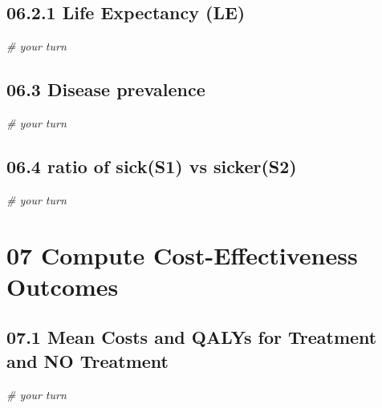 \documentclass[]{article}
\newenvironment{Shaded}{\begin{snugshade}}{\end{snugshade}}
\newcommand{\CommentTok}[1]{\textcolor[rgb]{0.56,0.35,0.01}{\textit{#1}}}
\begin{document}
\subsection{06.2.1 Life Expectancy (LE)}\label{life-expectancy-le}

\begin{Shaded}
\begin{Highlighting}[]
\CommentTok{# your turn}
\end{Highlighting}
\end{Shaded}

\subsection{06.3 Disease prevalence}\label{disease-prevalence}

\begin{Shaded}
\begin{Highlighting}[]
\CommentTok{# your turn}
\end{Highlighting}
\end{Shaded}

\subsection{06.4 ratio of sick(S1) vs
sicker(S2)}\label{ratio-of-sicks1-vs-sickers2}

\begin{Shaded}
\begin{Highlighting}[]
\CommentTok{# your turn}
\end{Highlighting}
\end{Shaded}

\section{07 Compute Cost-Effectiveness
Outcomes}\label{compute-cost-effectiveness-outcomes}

\subsection{07.1 Mean Costs and QALYs for Treatment and NO
Treatment}\label{mean-costs-and-qalys-for-treatment-and-no-treatment}

\begin{Shaded}
\begin{Highlighting}[]
\CommentTok{# your turn}
\end{Highlighting}
\end{Shaded}
\end{document}
